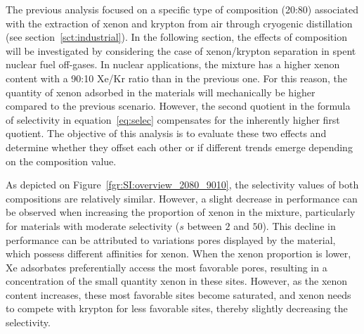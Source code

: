 \documentclass[main.tex]{subfiles}
\begin{document}
The previous analysis focused on a specific type of composition (20:80) associated with the extraction of xenon and krypton from air through cryogenic distillation (see section~\ref{sct:industrial}). In the following section, the effects of composition will be investigated by considering the case of xenon/krypton separation in spent nuclear fuel off-gases. In nuclear applications, the mixture has a higher xenon content with a 90:10 Xe/Kr ratio than in the previous one. For this reason, the quantity of xenon adsorbed in the materials will mechanically be higher compared to the previous scenario. However, the second quotient in the formula of selectivity in equation~\ref{eq:selec} compensates for the inherently higher first quotient. The objective of this analysis is to evaluate these two effects and determine whether they offset each other or if different trends emerge depending on the composition value. 

As depicted on Figure~\ref{fgr:SI:overview_2080_9010}, the selectivity values of both compositions are relatively similar. However, a slight decrease in performance can be observed when increasing the proportion of xenon in the mixture, particularly for materials with moderate selectivity ($s$ between $2$ and $50$). This decline in performance can be attributed to variations pores displayed by the material, which possess different affinities for xenon. When the xenon proportion is lower, Xe adsorbates preferentially access the most favorable pores, resulting in a concentration of the small quantity xenon in these sites. However, as the xenon content increases, these most favorable sites become saturated, and xenon needs to compete with krypton for less favorable sites, thereby slightly decreasing the selectivity.
\end{document}
